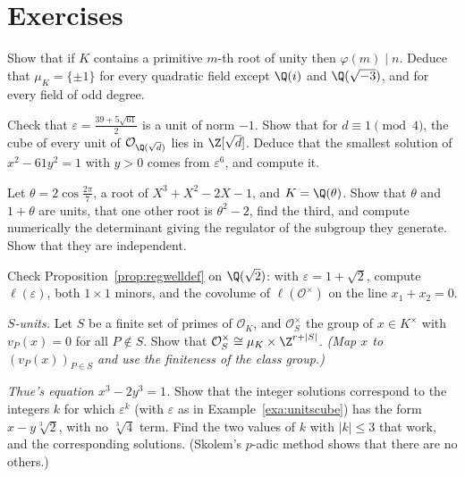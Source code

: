 \section{Exercises}

\begin{exercise}[$\star$]\label{ex:muK}
Show that if $K$ contains a primitive $m$-th root of unity then $\varphi(m)\mid n$. Deduce that $\mu_K=\{\pm1\}$ for every
quadratic field except $\Q(i)$ and $\Q(\sqrt{-3})$, and for every field of odd degree.
\end{exercise}

\begin{exercise}[$\star$]\label{ex:pell61}
Check that $\varepsilon=\frac{39+5\sqrt{61}}2$ is a unit of norm $-1$. Show that for $d\equiv1\pmod4$, the cube of every unit
of $\mathcal O_{\Q(\sqrt d)}$ lies in $\Z[\sqrt d]$. Deduce that the smallest solution of $x^2-61y^2=1$ with $y>0$ comes
from $\varepsilon^6$, and compute it.
\end{exercise}

\begin{exercise}[$\star\star$]\label{ex:cyclic7}
Let $\theta=2\cos\frac{2\pi}7$, a root of $X^3+X^2-2X-1$, and $K=\Q(\theta)$. Show that $\theta$ and $1+\theta$ are units, that
one other root is $\theta^2-2$, find the third, and compute numerically the determinant giving the
regulator of the subgroup they generate. Show that they are independent.
\end{exercise}

\begin{exercise}[$\star\star$]\label{ex:regcol}
Check Proposition~\ref{prop:regwelldef} on $\Q(\sqrt2)$: with $\varepsilon=1+\sqrt2$, compute $\ell(\varepsilon)$, both
$1\times1$ minors, and the covolume of $\ell(\mathcal O^\times)$ on the line $x_1+x_2=0$.
\end{exercise}

\begin{exercise}[$\star\star$]\label{ex:sunits}
\emph{$S$-units.} Let $S$ be a finite set of primes of $\mathcal O_K$, and $\mathcal O_S^\times$ the group of $x\in K^\times$ with
$v_P(x)=0$ for all $P\notin S$. Show that $\mathcal O_S^\times\cong\mu_K\times\Z^{r+|S|}$. \emph{(Map $x$ to $(v_P(x))_{P\in S}$
and use the finiteness of the class group.)}
\end{exercise}

\begin{exercise}[$\star\star$]\label{ex:thue}
\emph{Thue's equation $x^3-2y^3=1$.} Show that the integer solutions correspond to the integers $k$ for which
$\varepsilon^{k}$ (with $\varepsilon$ as in Example~\ref{exa:unitscube}) has the form $x-y\sqrt[3]2$, with no $\sqrt[3]4$
term. Find the two values of $k$ with $|k|\le3$ that work, and the corresponding solutions. (Skolem's $p$-adic method shows that there are no others.)
\end{exercise}

